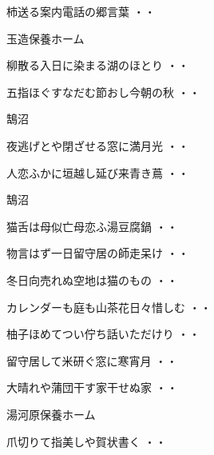 \begin{shiika}柿送る案内電話の郷言葉
\hfill{・・}\end{shiika}
\vspace{0.6cm}
玉造保養ホーム
\begin{shiika}柳散る入日に染まる湖のほとり
\hfill{・・}\end{shiika}
\begin{shiika}五指ほぐすなだむ節おし今朝の秋
\hfill{・・}\end{shiika}
\vspace{0.6cm}
鵠沼
\begin{shiika}夜逃げとや閉ざせる窓に満月光
\hfill{・・}\end{shiika}
\begin{shiika}人恋ふかに垣越し延び来青き蔦
\hfill{・・}\end{shiika}
\vspace{0.6cm}
鵠沼
\begin{shiika}猫舌は母似亡母恋ふ湯豆腐鍋
\hfill{・・}\end{shiika}
\begin{shiika}物言はず一日留守居の師走呆け
\hfill{・・}\end{shiika}
\begin{shiika}冬日向売れぬ空地は猫のもの
\hfill{・・}\end{shiika}
\begin{shiika}カレンダーも庭も山茶花日々惜しむ
\hfill{・・}\end{shiika}
\begin{shiika}柚子ほめてつい佇ち話いただけり
\hfill{・・}\end{shiika}
\begin{shiika}留守居して米研ぐ窓に寒宵月
\hfill{・・}\end{shiika}
\begin{shiika}大晴れや蒲団干す家干せぬ家
\hfill{・・}\end{shiika}
\vspace{0.6cm}
湯河原保養ホーム
\begin{shiika}爪切りて指美しや賀状書く
\hfill{・・}\end{shiika}
